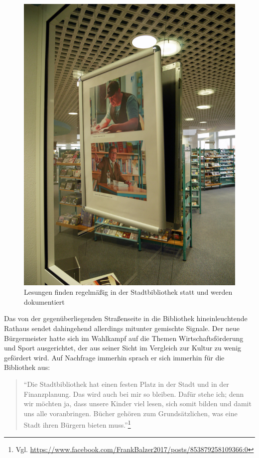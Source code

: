 \documentclass[a4paper,
fontsize=11pt,
oneside,
numbers=noperiodatend,
parskip=half-,
bibliography=totoc,
final
]{scrartcl}
\begin{document}
\begin{figure}
\centering
\includegraphics{img/image_4.jpg}
\caption{Lesungen finden regelmäßig in der Stadtbibliothek statt und
werden dokumentiert}
\end{figure}

Das von der gegenüberliegenden Straßenseite in die Bibliothek
hineinleuchtende Rathaus sendet dahingehend allerdings mitunter
gemischte Signale. Der neue Bürgermeister hatte sich im Wahlkampf auf
die Themen Wirtschaftsförderung und Sport ausgerichtet, der aus seiner
Sicht im Vergleich zur Kultur zu wenig gefördert wird. Auf Nachfrage
immerhin sprach er sich immerhin für die Bibliothek aus:

\begin{quote}
\enquote{Die Stadtbibliothek hat einen festen Platz in der Stadt und in
der Finanzplanung. Das wird auch bei mir so bleiben. Dafür stehe ich;
denn wir möchten ja, dass unsere Kinder viel lesen, sich somit bilden
und damit uns alle voranbringen. Bücher gehören zum Grundsätzlichen, was
eine Stadt ihren Bürgern bieten muss.}\footnote{Vgl.
  \url{https://www.facebook.com/FrankBalzer2017/posts/853879258109366:0}}
\end{quote}
\end{document}
